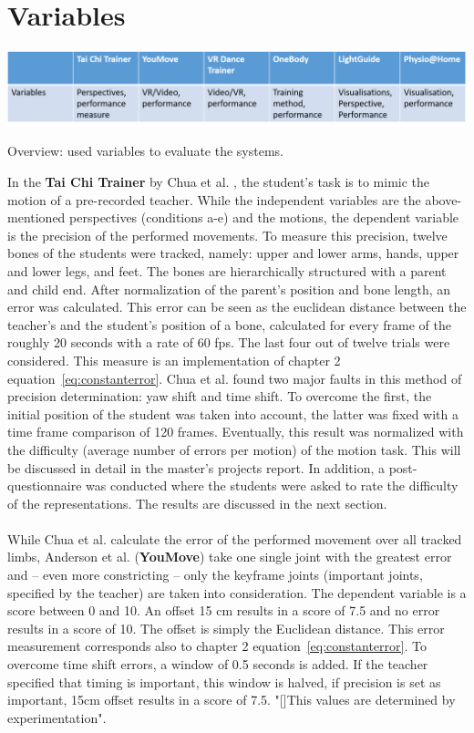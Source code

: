 \section{Variables}
\begin{table}[h]
	\centering
	\includegraphics[width=1.0\textwidth]{img/tbl4.png}
	\caption{Overview: used variables to evaluate the systems.}
	\label{fig:tbl4}
\end{table}
In the \textbf{Tai Chi Trainer} by Chua et al. \cite{Chua2003}, the student's task is to mimic the motion of a pre-recorded teacher. While the independent variables are the above-mentioned perspectives (conditions a-e) and the motions, the dependent variable is the precision of the performed movements. To measure this precision, twelve bones of the students were tracked, namely: upper and lower arms, hands, upper and lower legs, and feet. The bones are hierarchically structured with a parent and child end. After normalization of the parent's position and bone length, an error was calculated. This error can be seen as the euclidean distance between the teacher's and the student's position of a bone, calculated for every frame of the roughly 20 seconds with a rate of 60 fps. The last four out of twelve trials were considered. This measure is an implementation of chapter 2 equation~\ref{eq:constanterror}.
Chua et al. found two major faults in this method of precision determination: yaw shift and time shift. To overcome the first, the initial position of the student was taken into account, the latter was fixed with a time frame comparison of 120 frames. Eventually, this result was normalized with the difficulty (average number of errors per motion) of the motion task. This will be discussed in detail in the master's projects report. In addition, a post-questionnaire was conducted where the students were asked to rate the difficulty of the representations. The results are discussed in the next section.\\ \\
While Chua et al. calculate the error of the performed movement over all tracked limbs, Anderson et al. (\textbf{YouMove}) take one single joint with the greatest error and \--- even more constricting \--- only the keyframe joints (important joints, specified by the teacher) are taken into consideration. The dependent variable is a score between 0 and 10. An offset 15 cm results in a score of 7.5 and no error results in a score of 10. The offset is simply the Euclidean distance. This error measurement corresponds also to chapter 2 equation~\ref{eq:constanterror}. To overcome time shift errors, a window of 0.5 seconds is added. If the teacher specified that timing is important, this window is halved, if precision is set as important, 15cm offset results in a score of 7.5. "[]This values are determined by experimentation".\\ \\
